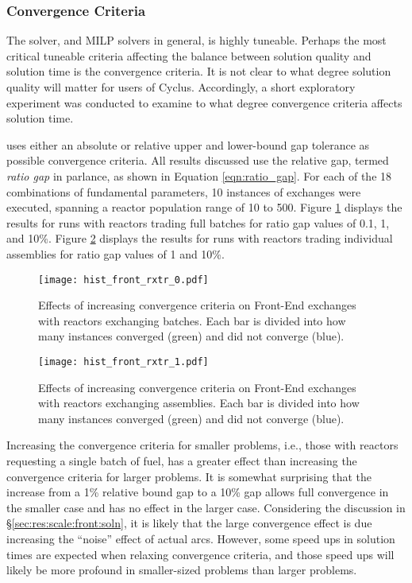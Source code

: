 \subsubsection{Convergence Criteria}

The \cbc solver, and MILP solvers in general, is highly tuneable. Perhaps the
most critical tuneable criteria affecting the balance between solution quality
and solution time is the convergence criteria. It is not clear to what degree
solution quality will matter for users of Cyclus. Accordingly, a short
exploratory experiment was conducted to examine to what degree convergence
criteria affects solution time.

\cbc uses either an absolute or relative upper and lower-bound gap tolerance as
possible convergence criteria. All results discussed use the relative gap,
termed \textit{ratio gap} in \cbc parlance, as shown in Equation
\ref{eqn:ratio_gap}. For each of the 18 combinations of fundamental parameters,
10 instances of exchanges were executed, spanning a reactor population range of
10 to 500. Figure \ref{fig:hist_front_rxtr_0} displays the results for runs with
reactors trading full batches for ratio gap values of 0.1, 1, and 10\%. Figure
\ref{fig:hist_front_rxtr_1} displays the results for runs with reactors trading
individual assemblies for ratio gap values of 1 and 10\%.

\begin{figure}[h!]
  \begin{center}
    \texttt{[image: hist\_front\_rxtr\_0.pdf]}
    \caption{
      \label{fig:hist_front_rxtr_0}
      Effects of increasing convergence criteria on Front-End exchanges with
      reactors exchanging batches. Each bar is divided into how many instances
      converged (green) and did not converge (blue). }
  \end{center}
\end{figure}

\begin{figure}[h!]
  \begin{center}
    \texttt{[image: hist\_front\_rxtr\_1.pdf]}
    \caption{
      \label{fig:hist_front_rxtr_1}
      Effects of increasing convergence criteria on Front-End exchanges with
      reactors exchanging assemblies. Each bar is divided into how many instances
      converged (green) and did not converge (blue).}
  \end{center}
\end{figure}

Increasing the convergence criteria for smaller problems, i.e., those with
reactors requesting a single batch of fuel, has a greater effect than increasing
the convergence criteria for larger problems. It is somewhat surprising that the
increase from a 1\% relative bound gap to a 10\% gap allows full convergence in
the smaller case and has no effect in the larger case. Considering the
discussion in \S \ref{sec:res:scale:front:soln}, it is likely that the large
convergence effect is due increasing the ``noise'' effect of actual
arcs. However, some speed ups in solution times are expected when relaxing
convergence criteria, and those speed ups will likely be more profound in
smaller-sized problems than larger problems.

